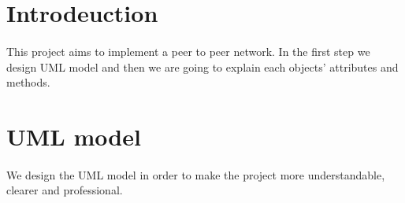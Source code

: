 \documentclass{article}
\begin{document}
\section{Introdeuction}
\paragraph{}This project aims to implement a peer to peer network. In the first step we design UML model and then we are going to explain each objects' attributes and methods. 
\section{UML model}
\paragraph{}We design the UML model in order to make the project more understandable, clearer and professional.
\\
\end{document}

